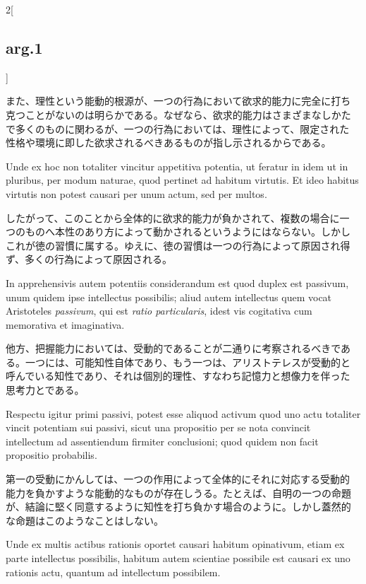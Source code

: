 \documentclass[paper=a4paper,fontsize=10pt,jafontsize=9pt,titlepage]{jlreq}
\begin{document}
\begin{paracol}{2}[\subsection{arg.1}]
\switchcolumn

また、理性という能動的根源が、一つの行為において欲求的能力に完全に打ち
克つことがないのは明らかである。なぜなら、欲求的能力はさまざまなしかた
で多くのものに関わるが、一つの行為においては、理性によって、限定された
性格や環境に即した欲求されるべきあるものが指し示されるからである。

\switchcolumn*

Unde ex hoc non totaliter vincitur appetitiva potentia, ut feratur in
idem ut in pluribus, per modum naturae, quod pertinet ad habitum
virtutis. Et ideo habitus virtutis non potest causari per unum actum,
sed per multos.

\switchcolumn

したがって、このことから全体的に欲求的能力が負かされて、複数の場合に一
つのものへ本性のあり方によって動かされるというようにはならない。しかし
これが徳の習慣に属する。ゆえに、徳の習慣は一つの行為によって原因され得
ず、多くの行為によって原因される。

\switchcolumn*

In apprehensivis autem potentiis considerandum est quod duplex est
passivum, unum quidem ipse intellectus possibilis; aliud autem
intellectus quem vocat Aristoteles {\itshape passivum}, qui est
{\itshape ratio particularis}, idest vis cogitativa cum memorativa et
imaginativa.

\switchcolumn

他方、把握能力においては、受動的であることが二通りに考察されるべきであ
る。一つには、可能知性自体であり、もう一つは、アリストテレスが受動的と
呼んでいる知性であり、それは個別的理性、すなわち記憶力と想像力を伴った
思考力とである。

\switchcolumn*

Respectu igitur primi passivi, potest esse aliquod activum quod uno
actu totaliter vincit potentiam sui passivi, sicut una propositio per
se nota convincit intellectum ad assentiendum firmiter conclusioni;
quod quidem non facit propositio probabilis.

\switchcolumn

第一の受動にかんしては、一つの作用によって全体的にそれに対応する受動的
能力を負かすような能動的なものが存在しうる。たとえば、自明の一つの命題
が、結論に堅く同意するように知性を打ち負かす場合のように。しかし蓋然的
な命題はこのようなことはしない。

\switchcolumn*

Unde ex multis actibus rationis oportet causari habitum opinativum,
etiam ex parte intellectus possibilis, habitum autem scientiae
possibile est causari ex uno rationis actu, quantum ad intellectum
possibilem.


\end{paracol}
\end{document}
